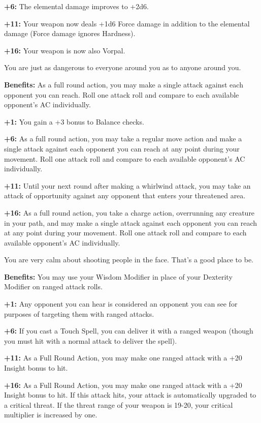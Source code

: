 \textbf{+6:} The elemental damage improves to +2d6.

\textbf{+11:} Your weapon now deals +1d6 Force damage in addition to the elemental damage (Force damage ignores Hardness).

\textbf{+16:} Your weapon is now also Vorpal.


You are just as dangerous to everyone around you as to anyone around you.

\textbf{Benefits:} As a full round action, you may make a single attack against each opponent you can reach. Roll one attack roll and compare to each available opponent's AC individually.

\textbf{+1:} You gain a +3 bonus to Balance checks.

\textbf{+6:} As a full round action, you may take a regular move action and make a single attack against each opponent you can reach at any point during your movement. Roll one attack roll and compare to each available opponent's AC individually.

\textbf{+11:} Until your next round after making a whirlwind attack, you may take an attack of opportunity against any opponent that enters your threatened area.

\textbf{+16:} As a full round action, you take a charge action, overrunning any creature in your path, and may make a single attack against each opponent you can reach at any point during your movement. Roll one attack roll and compare to each available opponent's AC individually.


You are very calm about shooting people in the face. That's a good place to be.

\textbf{Benefits:} You may use your Wisdom Modifier in place of your Dexterity Modifier on ranged attack rolls.

\textbf{+1:} Any opponent you can hear is considered an opponent you can see for purposes of targeting them with ranged attacks.

\textbf{+6:} If you cast a Touch Spell, you can deliver it with a ranged weapon (though you must hit with a normal attack to deliver the spell).

\textbf{+11:} As a Full Round Action, you may make one ranged attack with a +20 Insight bonus to hit.

\textbf{+16:} As a Full Round Action, you may make one ranged attack with a +20 Insight bonus to hit. If this attack hits, your attack is automatically upgraded to a critical threat. If the threat range of your weapon is 19-20, your critical multiplier is increased by one.
